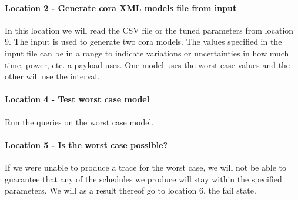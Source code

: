 \paragraph{Location 2 - Generate \gls{cora} XML models file from input} 
In this location we will read the CSV file or the tuned parameters from location 9. 
The input is used to generate two \gls{cora} models.
The values specified in the input file can be in a range to indicate variations or uncertainties in how much time, power, etc. a payload uses.
One model uses the worst case values and the other will use the interval. 


\paragraph{Location 4 - Test worst case model} 
Run the queries on the worst case model.

\paragraph{Location 5 - Is the worst case possible?} 
If we were unable to produce a trace for the worst case, we will not be able to guarantee that any of the schedules we produce will stay within the specified parameters. 
We will as a result thereof go to location 6, the fail state.

